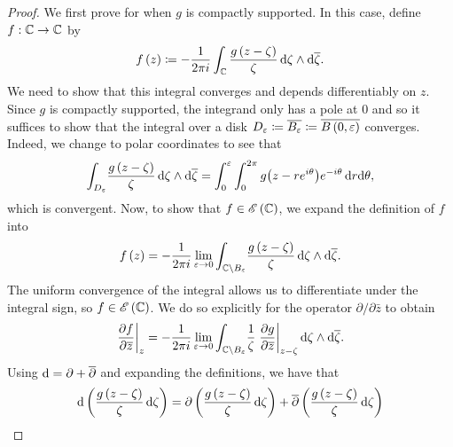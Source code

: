 \documentclass[../Moduli_Spaces_of_Riemann_Surfaces.tex]{subfiles}
\begin{document}
    \begin{proof}
        We first prove for when $g$ is compactly supported. In this case, define $f:\mathbb{C}\to\mathbb{C}$ by
        \begin{equation*}
            f\left(z\right)\coloneqq-\frac{1}{2\pi i}\int_{\mathbb{C}}\frac{g\left(z-\zeta\right)}{\zeta}\,\mathrm{d}\zeta\wedge\mathrm{d}\overline{\zeta}.
        \end{equation*}
        We need to show that this integral converges and depends differentiably on $z$. Since $g$ is compactly supported, the integrand only has a pole at $0$ and so it suffices to show that the integral over a disk $D_\varepsilon\coloneqq\overline{B_\varepsilon}\coloneqq\overline{B\left(0,\varepsilon\right)}$ converges. Indeed, we change to polar coordinates to see that
        \begin{equation*}
            \int_{ D_\varepsilon}\!\frac{g\left(z-\zeta\right)}{\zeta}\,\mathrm{d}\zeta\wedge\mathrm{d}\overline{\zeta}=\int_{0}^{\varepsilon}\int_{0}^{2\pi}g\big(z-re^{i\theta}\big)e^{-i\theta}\,\mathrm{d} r\mathrm{d}\theta,
        \end{equation*}
        which is convergent. Now, to show that $f\in\mathscr{E}\left(\mathbb{C}\right)$, we expand the definition of $f$ into
        \begin{equation*}
            f\left(z\right)=-\frac{1}{2\pi i}\lim\limits_{\varepsilon\to0}\int_{\mathbb{C}\setminus B_\varepsilon}\!\frac{g\left(z-\zeta\right)}{\zeta}\,\mathrm{d}\zeta\wedge\mathrm{d}\overline{\zeta}.
        \end{equation*}
        The uniform convergence of the integral allows us to differentiate under the integral sign, so $f\in\mathscr{E}\left(\mathbb{C}\right)$. We do so explicitly for the operator $\partial/\partial\bar{z}$ to obtain
        \begin{equation*}
            \left.\frac{\partial f}{\partial\overline{z}}\right|_z=-\frac{1}{2\pi i}\lim\limits_{\varepsilon\to0}\int_{\mathbb{C}\setminus B_\varepsilon}\!\frac{1}{\zeta}\left.\frac{\partial g}{\partial\overline{z}}\right|_{z-\zeta}\mathrm{d}\zeta\wedge\mathrm{d}\overline{\zeta}.
        \end{equation*}
        Using $\mathrm{d}=\partial+\overline{\partial}$ and expanding the definitions, we have that
        \begin{equation*}
            \begin{aligned}
                \d\l(\frac{g\l(z-\zeta\r)}{\zeta}\,\d\zeta\r)&=\partial\l(\frac{g\l(z-\zeta\r)}{\zeta}\,\d\zeta\r)+\bar{\partial}\l(\frac{g\l(z-\zeta\r)}{\zeta}\,\d\zeta\r) \\

\end{aligned}
\end{equation*}
\end{proof}
\end{document}

